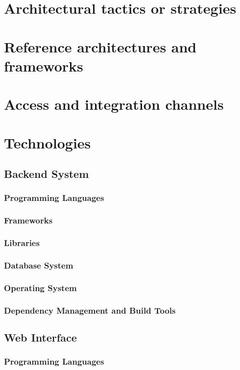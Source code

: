 \documentclass[a4paper,10pt]{article}
\begin{document}
\section{Architectural tactics or strategies}
 
\section{Reference architectures and frameworks}
 
\section{Access and integration channels}

\section{Technologies}
\subsection{Backend System}
\subsubsection{Programming Languages}
\subsubsection{Frameworks}
\subsubsection{Libraries}
\subsubsection{Database System}
\subsubsection{Operating System}
\subsubsection{Dependency Management and Build Tools}

\subsection{Web Interface}
\subsubsection{Programming Languages}
\end{document}
